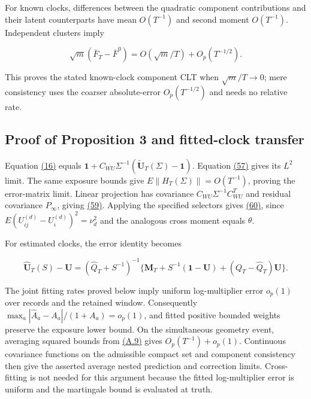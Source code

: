 \documentclass[11pt]{article}
\begin{document}
For known clocks, differences between the quadratic component contributions and their latent counterparts have mean \(O(T^{-1})\) and second moment \(O(T^{-1})\). Independent clusters imply

\begin{equation*}
\sqrt m(\bar F_T-\bar F^0)=O(\sqrt m/T)+O_p(T^{-1/2}).
\tag{A.8}\label{eq:A.8}
\end{equation*}

This proves the stated known-clock component CLT when \(\sqrt m/T\to0\); mere consistency uses the coarser absolute-error \(O_p(T^{-1/2})\) and needs no relative rate.

\subsection{Proof of Proposition 3 and fitted-clock transfer}\label{sec:A.3}

Equation \hyperref[eq:16]{(16)} equals
\(\mathbf1+C_{WU}\Sigma^{-1}(\widetilde{\mathbf U}_T(\Sigma)-\mathbf1)\).
Equation \hyperref[eq:57]{(57)} gives its \(L^2\) limit. The same exposure bounds give \(E\|H_T(\Sigma)\|=O(T^{-1})\), proving the error-matrix limit. Linear projection has covariance
\(C_{WU}\Sigma^{-1}C_{WU}^T\) and residual covariance \(P_\infty\), giving \hyperref[eq:59]{(59)}. Applying the specified selectors gives \hyperref[eq:60]{(60)}, since
\(E(U_{ij}^{(d)}-U_i^{(d)})^2=\nu_d^2\) and the analogous cross moment equals \(\theta\).

For estimated clocks, the error identity becomes

\begin{equation*}
\widehat{\mathbf U}_T(S)-\mathbf U
=(\widehat Q_T+S^{-1})^{-1}
\{\mathbf M_T+S^{-1}(\mathbf1-\mathbf U)
 +(Q_T-\widehat Q_T)\mathbf U\}.
\tag{A.9}\label{eq:A.9}
\end{equation*}

The joint fitting rates proved below imply uniform log-multiplier error \(o_p(1)\) over records and the retained window. Consequently
\(\max_a|\widehat A_a-A_a|/(1+A_a)=o_p(1)\), and fitted positive bounded weights preserve the exposure lower bound. On the simultaneous geometry event, averaging squared bounds from \hyperref[eq:A.9]{(A.9)} gives \(O_p(T^{-1})+o_p(1)\). Continuous covariance functions on the admissible compact set and component consistency then give the asserted average nested prediction and correction limits. Cross-fitting is not needed for this argument because the fitted log-multiplier error is uniform and the martingale bound is evaluated at truth.
\end{document}
